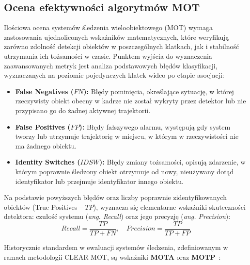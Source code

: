\subsection{Ocena efektywności algorytmów MOT}

Ilościowa ocena systemów śledzenia wieloobiektowego (MOT) wymaga zastosowania ujednoliconych
wskaźników matematycznych, które weryfikują zarówno zdolność detekcji obiektów w poszczególnych
klatkach, jak i stabilność utrzymania ich tożsamości w czasie. Punktem wyjścia do wyznaczenia
zaawansowanych metryk jest analiza podstawowych błędów klasyfikacji, wyznaczanych na poziomie
pojedynczych klatek wideo po etapie asocjacji:

\begin{itemize}
  \item \textbf{False Negatives ($FN$):} Błędy pominięcia, określające sytuację, w której rzeczywisty obiekt obecny w kadrze nie został wykryty przez detektor lub nie przypisano go do żadnej aktywnej trajektorii.
  \item \textbf{False Positives ($FP$):} Błędy fałszywego alarmu, występują gdy system tworzy lub utrzymuje trajektorię w miejscu, w którym w rzeczywistości nie ma żadnego obiektu.
  \item \textbf{Identity Switches ($IDSW$):} Błędy zmiany tożsamości, opisują zdarzenie, w którym poprawnie śledzony obiekt otrzymuje od nowy, nieużywany dotąd identyfikator lub przejmuje identyfikator innego obiektu.
\end{itemize}

Na podstawie powyższych błędów oraz liczby poprawnie zidentyfikowanych obiektów (True Positives --
$TP$), wyznacza się elementarne wskaźniki skuteczności detektora: czułość systemu (\textit{ang.
  Recall}) oraz jego precyzję (\textit{ang. Precision}):
\begin{equation}
  Recall = \frac{TP}{TP + FN}, \quad Precision = \frac{TP}{TP + FP}
\end{equation}

Historycznie standardem w ewaluacji systemów śledzenia, zdefiniowanym w ramach metodologii CLEAR
MOT, są wskaźniki \textbf{MOTA} oraz \textbf{MOTP}~\cite{bernardin2008}:

